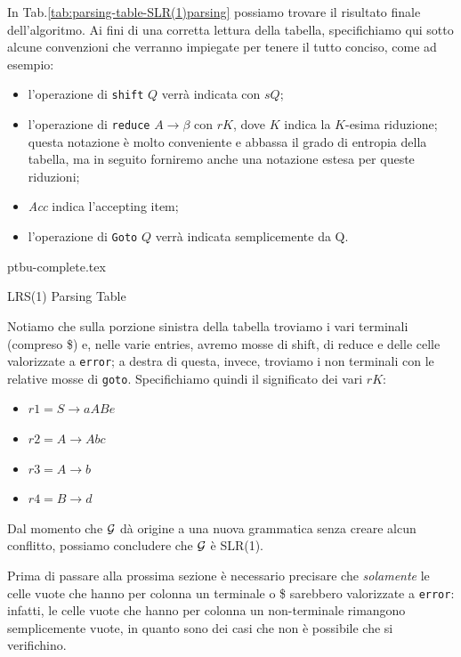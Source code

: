 \documentclass[class=book, crop=false, oneside, 12pt]{standalone}
\begin{document}
In Tab.\ref{tab:parsing-table-SLR(1)parsing} possiamo trovare il risultato finale dell'algoritmo. Ai fini di una corretta lettura della tabella, specifichiamo qui sotto alcune convenzioni che verranno impiegate per tenere il tutto conciso, come ad esempio:
\begin{itemize}
    \item l'operazione di \texttt{shift} \(Q\) verrà indicata con \(sQ\);
    \item l'operazione di \texttt{reduce} \(A \rightarrow \beta\) con \(rK\), dove \(K\) indica la \(K\)-esima riduzione; questa notazione è molto conveniente e abbassa il grado di entropia della tabella, ma in seguito forniremo anche una notazione estesa per queste riduzioni;
    \item \emph{Acc} indica l'accepting item;
    \item l'operazione di \texttt{Goto} \(Q\) verrà indicata semplicemente da Q.
\end{itemize}
\begin{table}[H]
    \centering
    {ptbu-complete.tex}
    \caption{LRS(1) Parsing Table}
    \label{tab:parsing-table-SLR(1)parsing}
\end{table}
Notiamo che sulla porzione sinistra della tabella troviamo i vari terminali (compreso \$) e, nelle varie entries, avremo mosse di shift, di reduce e delle celle valorizzate a \texttt{error}; a destra di questa, invece, troviamo i non terminali con le relative mosse di \texttt{goto}.
Specifichiamo quindi il significato dei vari \(rK\):
\begin{itemize}
    \item \(r1 = S \to aABe\)
    \item \(r2 = A \to Abc\)
    \item \(r3 = A \to b\)
    \item \(r4 = B \to d\)
\end{itemize}
Dal momento che \(\mathcal{G}\) dà origine a una nuova grammatica senza creare alcun conflitto, possiamo concludere che \(\mathcal{G}\) è SLR(1).

Prima di passare alla prossima sezione è necessario precisare che \emph{solamente} le celle vuote che hanno per colonna un terminale o \$ sarebbero valorizzate a \texttt{error}: infatti, le celle vuote che hanno per colonna un non-terminale rimangono semplicemente vuote, in quanto sono dei casi che non è possibile che si verifichino. 
\end{document}
